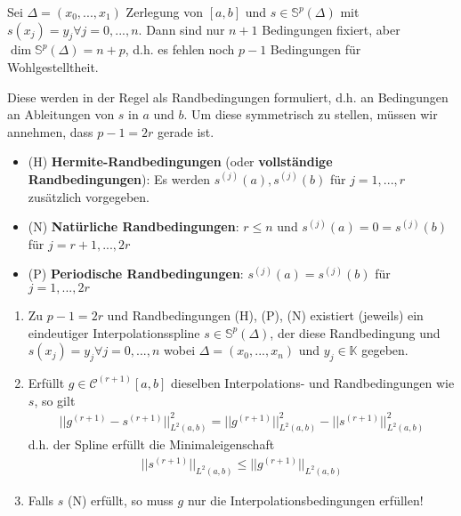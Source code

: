 \begin{remark}
	Sei $\Delta = (x_0, ..., x_1)$ Zerlegung von $[a, b]$ und $s \in \mathbb{S}^p(\Delta)$ mit $s(x_j) = y_j \forall j=0, ..., n$. Dann sind nur $n+1$ Bedingungen fixiert, aber $\dim \mathbb{S}^p(\Delta) = n+p$, d.h. es fehlen noch $p-1$ Bedingungen für Wohlgestelltheit.
	
	Diese werden in der Regel als Randbedingungen formuliert, d.h. an Bedingungen an Ableitungen von $s$ in $a$ und $b$. Um diese symmetrisch zu stellen, müssen wir annehmen, dass $p-1 = 2r$ gerade ist.
	
	\begin{itemize}
		\item (H) \textbf{Hermite-Randbedingungen} (oder \textbf{vollständige Randbedingungen}): Es werden $s^{(j)}(a), s^{(j)}(b)$ für $j = 1, ..., r$ zusätzlich vorgegeben.
		
		\item (N) \textbf{Natürliche Randbedingungen}: $r \leq n$ und $s^{(j)}(a) = 0 = s^{(j)}(b)$ für $j=r+1, ..., 2r$
		
		\item (P) \textbf{Periodische Randbedingungen}: $s^{(j)}(a) = s^{(j)}(b)$ für $j=1, ..., 2r$
	\end{itemize}
\end{remark}

\begin{theorem}
	\begin{enumerate}
		\item Zu $p-1 = 2r$ und Randbedingungen (H), (P), (N) existiert (jeweils) ein eindeutiger Interpolationsspline $s \in \mathbb{S}^p(\Delta)$, der diese Randbedingung und $s(x_j) = y_j \forall j=0, ..., n$ wobei $\Delta = (x_0, ..., x_n)$ und $y_j \in \mathbb{K}$ gegeben.
		
		\item Erfüllt $g \in \mathcal{C}^{(r+1)}[a, b]$ dieselben Interpolations- und Randbedingungen wie $s$, so gilt
		\begin{align*}
			||g^{(r+1)} - s^{(r+1)}||_{L^2(a,b)}^2 = ||g^{(r+1)}||_{L^2(a,b)}^2 - ||s^{(r+1)}||_{L^2(a,b)}^2
		\end{align*}
		d.h. der Spline erfüllt die Minimaleigenschaft
		\begin{align*}
			||s^{(r+1)}||_{L^2(a,b)} \leq ||g^{(r+1)}||_{L^2(a,b)}
		\end{align*}
		
		\item Falls $s$ (N) erfüllt, so muss $g$ nur die Interpolationsbedingungen erfüllen!
	\end{enumerate}
\end{theorem}

